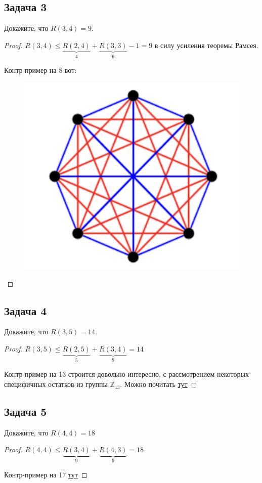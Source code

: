 \subsection{Задача 3}

Докажите, что $R(3,4) = 9$.

\begin{proof}
    $R(3,4) \leq \underbrace{R(2, 4)}_{4} + \underbrace{R(3, 3)}_{6} - 1 = 9$ в силу усиления теоремы Рамсея. 

    Контр-пример на 8 вот:

    \begin{figure}[H]
        \centering
        \includegraphics[width=0.25\linewidth]{sem9_task3.png}
    \end{figure}
\end{proof}

\subsection{Задача 4}

Докажите, что $R(3,5) = 14$.

\begin{proof}
    $R(3,5) \leq \underbrace{R(2, 5)}_{5} + \underbrace{R(3, 4)}_{9} = 14$

    Контр-пример на 13 строится довольно интересно, с рассмотрением некоторых специфичных остатков из группы $\mathbb{Z}_{13}$. Можно почитать \href{https://math.stackexchange.com/questions/190982/prove-ramsey-number-r3-5-14}{тут}
\end{proof}


\subsection{Задача 5}

Докажите, что $R(4, 4) = 18$

\begin{proof}
    $R(4, 4) \leq \underbrace{R(3, 4)}_{9} + \underbrace{R(4, 3)}_{9} = 18$

    Контр-пример на 17 \href{https://www.cut-the-knot.org/arithmetic/combinatorics/Ramsey44.shtml}{тут}
\end{proof}

